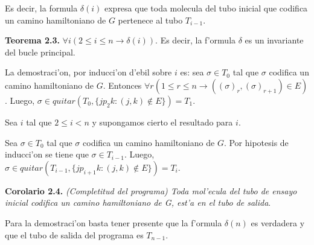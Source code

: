 \documentclass[12pt]{article}
\begin{document}
Es decir, la formula $\delta(i)$ expresa que toda molecula del tubo inicial que codifica un camino hamiltoniano
de $G$ pertenece al tubo $T_{i-1}$.

\textbf{Teorema 2.3.} $\forall i (2 \leq i \leq n \longrightarrow \delta(i))$. Es decir, la f'ormula $\delta$ es un invariante del
bucle principal.

La demostraci'on, por inducci'on d'ebil sobre $i$ es: sea $\sigma \in T_{0}$ tal que $\sigma$ codifica un camino
hamiltoniano de $G$. Entonces $\forall r (1 \leq r \leq n \longrightarrow ((\sigma)_{r},(\sigma)_{r+1}) \in E)$. Luego,
$\sigma \in quitar(T_{0}, \{jp_{2}k : (j,k) \notin E\}) = T_{1}$.

Sea $i$ tal que $2 \leq i < n$ y supongamos cierto el resultado para $i$.

Sea $\sigma \in T_{0}$ tal que $\sigma$ codifica un camino hamiltoniano de $G$. Por hipotesis de inducci'on se tiene que
$\sigma \in T_{i-1}$. Luego, $\sigma \in quitar(T_{i-1},\{jp_{i+1}k : (j,k) \notin E\}) = T_{i}$.

\textbf{Corolario 2.4.} \textit{(Completitud del programa) Toda mol'ecula del tubo de ensayo inicial codifica un camino
 hamiltoniano de G, est'a en el tubo de salida}.

Para la demostraci'on basta tener presente que la f'ormula $\delta(n)$ es verdadera y que el tubo de salida del
programa es $T_{n-1}$.

\printbibliography
\end{document}
